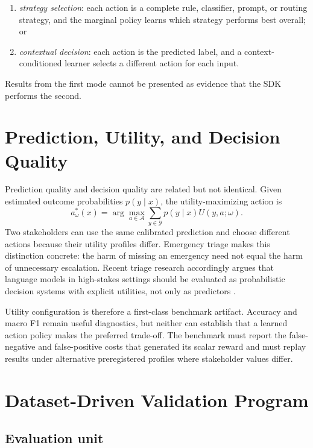 \documentclass[conference]{IEEEtran}
\begin{document}
\begin{enumerate}
\item \emph{strategy selection}: each action is a complete rule,
  classifier, prompt, or routing strategy, and the marginal policy
  learns which strategy performs best overall; or
\item \emph{contextual decision}: each action is the predicted label,
  and a context-conditioned learner selects a different action for
  each input.
\end{enumerate}

Results from the first mode cannot be presented as evidence that the
SDK performs the second.

\section{Prediction, Utility, and Decision Quality}
\label{sec:utility}

Prediction quality and decision quality are related but not
identical. Given estimated outcome probabilities $p(y\mid x)$, the
utility-maximizing action is
\begin{equation}
a^*_{\omega}(x)=\arg\max_{a\in\mathcal{A}}
\sum_{y\in\mathcal{Y}}p(y\mid x)U(y,a;\omega).
\label{eq:expected-utility}
\end{equation}
Two stakeholders can use the same calibrated prediction and choose
different actions because their utility profiles differ. Emergency
triage makes this distinction concrete: the harm of missing an
emergency need not equal the harm of unnecessary escalation. Recent
triage research accordingly argues that language models in
high-stakes settings should be evaluated as probabilistic decision
systems with explicit utilities, not only as predictors
\cite{highstakestriage2026}.

Utility configuration is therefore a first-class benchmark artifact.
Accuracy and macro F1 remain useful diagnostics, but neither can
establish that a learned action policy makes the preferred trade-off.
The benchmark must report the false-negative and false-positive costs
that generated its scalar reward and must replay results under
alternative preregistered profiles where stakeholder values differ.

\section{Dataset-Driven Validation Program}
\label{sec:validation}

\subsection{Evaluation unit}
\end{document}
